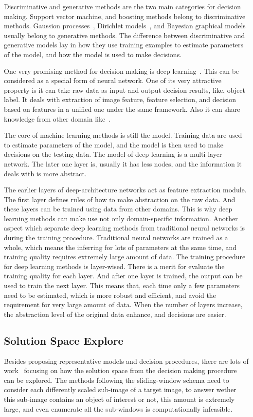 Discriminative and generative methods are the two main categories for decision making.
Support vector machine, and boosting methods belong to discriminative methods. Gaussion processes~\citep{gprocess}, Dirichlet models~\citep{lda,dp,hdp}, and Bayesian graphical models~\citep{bgm} usually belong to generative methods. The difference between discriminative and generative models lay in how they use training examples to estimate parameters of the model, and how the model is used to make decisions.

One very promising method for decision making is deep learning~\citep{dlearn}. This can be considered as a special form of neural network. One of its very attractive property is it can take raw data as input and output decision results, like, object label. It deals with extraction of image feature, feature selection, and decision based on features in a unified one under the same framework. Also it can share knowledge from other domain like~\citep{tlsurvey}.

The core of machine learning methods is still the model. Training data are used to estimate  parameters of the model, and the model is then used to make decisions on the testing data. The model of deep learning is a multi-layer network. The later one layer is, usually it has less nodes, and the information it deals with is more abstract.

The earlier layers of deep-architecture networks act as feature extraction module. The first layer defines rules of how to make abstraction on the raw data. And these layers can be trained using  data from other domains. This is why deep learning methods can make use not only domain-specific information. Another aspect which separate deep learning methods from traditional neural networks is during the training procedure. Traditional neural networks are trained as a whole, which means the inferring for lots of parameters at the same time, and training quality  requires extremely large amount of data. The training procedure for deep learning methods is layer-wised. There is a merit for evaluate the training quality for each layer. And after one layer is trained, the output can be used to train the next layer. This means that, each time only a few parameters need to be estimated, which is more robust and efficient, and avoid the requirement for very large amount of data. When the number of layers increase, the abstraction level of the original data enhance, and decisions are easier.


\subsection{Solution Space Explore}
Besides proposing representative models and decision procedures, there are lots of work~\citep{408,spm,ciod} focusing on how the solution space from the decision making procedure can be explored. The methods following the sliding-window schema need to consider each differently scaled sub-image of a target image, to answer wether this sub-image contains an object of interest or not, this amount is extremely large, and even enumerate all the sub-windows is computationally infeasible.

